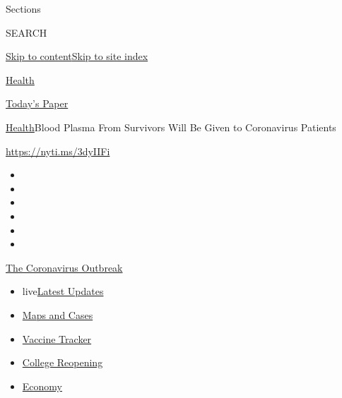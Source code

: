 Sections

SEARCH

\protect\hyperlink{site-content}{Skip to
content}\protect\hyperlink{site-index}{Skip to site index}

\href{https://www.nytimes3xbfgragh.onion/section/health}{Health}

\href{https://myaccount.nytimes3xbfgragh.onion/auth/login?response_type=cookie\&client_id=vi}{}

\href{https://www.nytimes3xbfgragh.onion/section/todayspaper}{Today's
Paper}

\href{/section/health}{Health}\textbar{}Blood Plasma From Survivors Will
Be Given to Coronavirus Patients

\url{https://nyti.ms/3dyIIFi}

\begin{itemize}
\item
\item
\item
\item
\item
\item
\end{itemize}

\href{https://www.nytimes3xbfgragh.onion/news-event/coronavirus?action=click\&pgtype=Article\&state=default\&region=TOP_BANNER\&context=storylines_menu}{The
Coronavirus Outbreak}

\begin{itemize}
\tightlist
\item
  live\href{https://www.nytimes3xbfgragh.onion/2020/08/04/world/coronavirus-cases.html?action=click\&pgtype=Article\&state=default\&region=TOP_BANNER\&context=storylines_menu}{Latest
  Updates}
\item
  \href{https://www.nytimes3xbfgragh.onion/interactive/2020/us/coronavirus-us-cases.html?action=click\&pgtype=Article\&state=default\&region=TOP_BANNER\&context=storylines_menu}{Maps
  and Cases}
\item
  \href{https://www.nytimes3xbfgragh.onion/interactive/2020/science/coronavirus-vaccine-tracker.html?action=click\&pgtype=Article\&state=default\&region=TOP_BANNER\&context=storylines_menu}{Vaccine
  Tracker}
\item
  \href{https://www.nytimes3xbfgragh.onion/2020/08/02/us/covid-college-reopening.html?action=click\&pgtype=Article\&state=default\&region=TOP_BANNER\&context=storylines_menu}{College
  Reopening}
\item
  \href{https://www.nytimes3xbfgragh.onion/live/2020/08/04/business/stock-market-today-coronavirus?action=click\&pgtype=Article\&state=default\&region=TOP_BANNER\&context=storylines_menu}{Economy}
\end{itemize}

